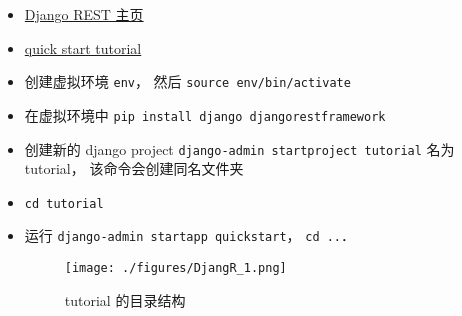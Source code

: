 
\begin{itemize}
\item \href{https://www.django-rest-framework.org/}{Django REST 主页}
\item \href{https://www.django-rest-framework.org/tutorial/quickstart/}{quick start tutorial}
\item 创建虚拟环境 \verb|env|， 然后 \verb|source env/bin/activate|
\item 在虚拟环境中 \verb|pip install django djangorestframework|
\item 创建新的 django project \verb|django-admin startproject tutorial| 名为 tutorial， 该命令会创建同名文件夹
\item \verb|cd tutorial|
\item 运行 \verb|django-admin startapp quickstart|， \verb|cd ..|．
\begin{figure}[ht]
\centering
\texttt{[image: ./figures/DjangR\_1.png]}
\caption{tutorial 的目录结构} \label{DjangR_fig1}
\end{figure}
\end{itemize}
